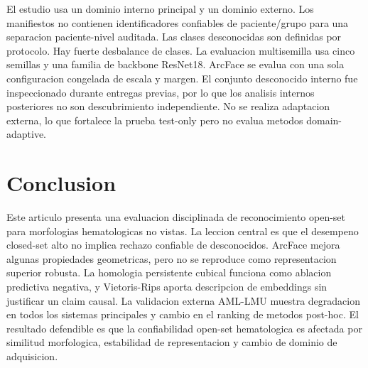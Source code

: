 \documentclass[11pt]{article}
\begin{document}
El estudio usa un dominio interno principal y un dominio externo. Los manifiestos no contienen identificadores confiables de paciente/grupo para una separacion paciente-nivel auditada. Las clases desconocidas son definidas por protocolo. Hay fuerte desbalance de clases. La evaluacion multisemilla usa cinco semillas y una familia de backbone ResNet18. ArcFace se evalua con una sola configuracion congelada de escala y margen. El conjunto desconocido interno fue inspeccionado durante entregas previas, por lo que los analisis internos posteriores no son descubrimiento independiente. No se realiza adaptacion externa, lo que fortalece la prueba test-only pero no evalua metodos domain-adaptive.

\section{Conclusion}

Este articulo presenta una evaluacion disciplinada de reconocimiento open-set para morfologias hematologicas no vistas. La leccion central es que el desempeno closed-set alto no implica rechazo confiable de desconocidos. ArcFace mejora algunas propiedades geometricas, pero no se reproduce como representacion superior robusta. La homologia persistente cubical funciona como ablacion predictiva negativa, y Vietoris-Rips aporta descripcion de embeddings sin justificar un claim causal. La validacion externa AML-LMU muestra degradacion en todos los sistemas principales y cambio en el ranking de metodos post-hoc. El resultado defendible es que la confiabilidad open-set hematologica es afectada por similitud morfologica, estabilidad de representacion y cambio de dominio de adquisicion.



\end{document}
